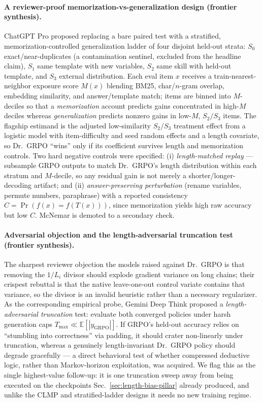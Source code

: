 \documentclass{article}
\begin{document}
\paragraph{A reviewer-proof memorization-vs-generalization design (frontier synthesis).}
ChatGPT Pro proposed replacing a bare paired test with a stratified,
memorization-controlled generalization ladder of four disjoint held-out strata:
$S_0$ exact/near-duplicates (a contamination sentinel, excluded from the headline
claim), $S_1$ same template with new variables, $S_2$ same skill with held-out
template, and $S_3$ external distribution. Each eval item $x$ receives a
train-nearest-neighbor exposure score $M(x)$ blending BM25, char/$n$-gram overlap,
embedding similarity, and answer/template match; items are binned into
$M$-deciles so that a \emph{memorization} account predicts gains concentrated in
high-$M$ deciles whereas \emph{generalization} predicts nonzero gains in low-$M$,
$S_2/S_3$ items. The flagship estimand is the adjusted low-similarity
$S_2/S_3$ treatment effect from a logistic model with item-difficulty and
seed random effects and a length covariate, so Dr.~GRPO ``wins'' only if its
coefficient survives length and memorization controls. Two hard negative
controls were specified: (i) \emph{length-matched replay} --- subsample GRPO
outputs to match Dr.~GRPO's length distribution within each stratum and
$M$-decile, so any residual gain is not merely a shorter/longer-decoding
artifact; and (ii) \emph{answer-preserving perturbation} (rename variables,
permute numbers, paraphrase) with a reported consistency
$C=\Pr\!\left(f(x)=f(T(x))\right)$, since memorization yields high raw accuracy
but low $C$. McNemar is demoted to a secondary check.

\paragraph{Adversarial objection and the length-adversarial truncation test (frontier synthesis).}
The sharpest reviewer objection the models raised against Dr.~GRPO is that
removing the $1/L_i$ divisor should explode gradient variance on long chains;
their crispest rebuttal is that the native leave-one-out control variate contains
that variance, so the divisor is an invalid heuristic rather than a necessary
regularizer. As the corresponding empirical probe, Gemini Deep Think proposed a
\emph{length-adversarial truncation} test: evaluate both converged policies under
harsh generation caps $T_{\max}\ll\mathbb{E}[|y_{\mathrm{GRPO}}|]$. If GRPO's
held-out accuracy relies on ``stumbling into correctness'' via padding, it should
crater non-linearly under truncation, whereas a genuinely length-invariant
Dr.~GRPO policy should degrade gracefully --- a direct behavioral test of whether
compressed deductive logic, rather than Markov-horizon exploitation, was
acquired. We flag this as the single highest-value follow-up: it is one
truncation sweep away from being executed on the checkpoints
Sec.~\ref{sec:length-bias-pillar} already produced, and unlike the CLMP and
stratified-ladder designs it needs no new training regime.
\end{document}
